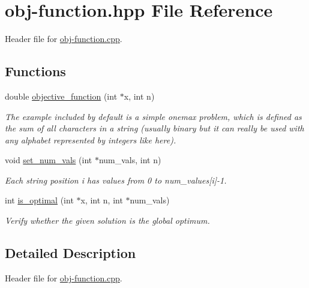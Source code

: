 \hypertarget{obj-function_8hpp}{
\section{obj-function.hpp File Reference}
\label{obj-function_8hpp}
}
Header file for \hyperlink{obj-function_8cpp}{obj-function.cpp}. 

\subsection*{Functions}
\begin{CompactItemize}
\item 
double \hyperlink{obj-function_8hpp_633957adde57ee545797def8e74eb8e4}{objective\_\-function} (int $\ast$x, int n)
\begin{CompactList}\small\item\em The example included by default is a simple onemax problem, which is defined as the sum of all characters in a string (usually binary but it can really be used with any alphabet represented by integers like here). \item\end{CompactList}\item 
void \hyperlink{obj-function_8hpp_1f6693b983930dbfe403246098bbd9ef}{set\_\-num\_\-vals} (int $\ast$num\_\-vals, int n)
\begin{CompactList}\small\item\em Each string position i has values from 0 to num\_\-values\mbox{[}i\mbox{]}-1. \item\end{CompactList}\item 
int \hyperlink{obj-function_8hpp_39144c50109e3a793e1aecd4014ece28}{is\_\-optimal} (int $\ast$x, int n, int $\ast$num\_\-vals)
\begin{CompactList}\small\item\em Verify whether the given solution is the global optimum. \item\end{CompactList}\end{CompactItemize}


\subsection{Detailed Description}
Header file for \hyperlink{obj-function_8cpp}{obj-function.cpp}. 



